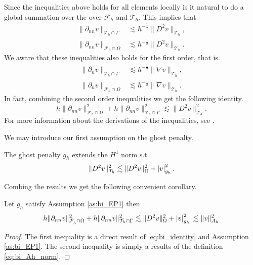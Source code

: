 Since the inequalities above holds for all elements locally is it natural to do a global summation over the over $\mathcal{F}_{h} $ and $\mathcal{T}_{h} $. This implies that
\begin{align}
\label{eq:bi_cut_inverse_1}
\| \partial _{nn} v \|_{ \mathcal{T} _{h} \cap \Gamma  }^{  } &\lesssim h^{-\frac{1}{2}} \| D^2 v \|_{ \mathcal{T}_h }^{  }, \\
\label{eq:bi_cut_inverse_2}
\| \partial _{nn}  v \|_{ \mathcal{F}_h \cap \Omega    }^{  }  &  \lesssim   h^{-\frac{1}{2}} \| D^2 v \|_{ \mathcal{T}_h  }^{  }.
\end{align}
    We aware that these inequalities also holds for the first order, that is.
\begin{align}
\label{eq:bi_n_cut_inverse_1}
\| \partial _{n} v \|_{ \mathcal{T} _{h} \cap \Gamma  }^{  } &\lesssim h^{-\frac{1}{2}} \| \nabla v \|_{ \mathcal{T}_h }^{  }, \\
\label{eq:bi_n_cut_inverse_2}
\| \partial _{n}  v \|_{ \mathcal{F}_h \cap \Omega    }^{  }  &  \lesssim   h^{-\frac{1}{2}} \| \nabla v \|_{ \mathcal{T}_h  }^{  }.
\end{align}
In fact, combining the second order inequalities we get the following identity.
\begin{equation}
\label{eq:bi_identity}
h\| \partial _{nn}  v \|_{ \mathcal{F}_h \cap \Omega    }^{2 } + h\| \partial _{nn} v \|_{ \mathcal{T} _{h} \cap \Gamma  }^{2  } \lesssim \| D^2 v \|_{ \mathcal{T} _{h}  }^{2  }.
\end{equation}
For more information about the derivations of the inequalities, see \cite{gurkan2019stabilized}.

We may introduce our first assumption on the ghost penalty.
\begin{assumption}[EP1]
    \label{as:bi_EP1}
    The ghost penalty $g_{h}$ extends the $H^{1}$ norm s.t. \[
    \| D^2 v \|_{ \mathcal{T} _{h} }^{ 2 } \lesssim  \| D^2 v \|_{ \Omega  }^{ 2 } + \left\lvert  v  \right\rvert _{g_{h}}^{2}.
    \]
\end{assumption}


Combing the results we get the following convenient corollary.

\begin{corollary}
    \label{cor:bi_inverse_thm}
    Let $g_{h}$ satisfy Assumption \ref{as:bi_EP1} then
    \[
            h\| \partial _{nn}  v \|_{ \mathcal{F}_h^{} \cap \Omega    }^{2 } + h\| \partial _{nn} v \|_{ \mathcal{T} _{h} \cap \Gamma  }^{2  }   \lesssim  \| D^2 v \|_{ \Omega  }^{ 2 } + \left\lvert  v  \right\rvert _{g_{h}}^{2} \\
              \lesssim \| v \|_{ A_{h} }^{  2}
    \]
\end{corollary}
\begin{proof}
    The first inequality is a direct result of \eqref{eq:bi_identity} and Assumption \ref{as:bi_EP1}. The second inequality is simply a results of the definition \eqref{eq:bi_Ah_norm}.
\end{proof}

